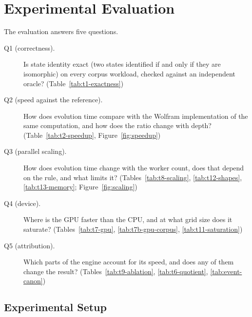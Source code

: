 \section{Experimental Evaluation}
\label{sec:benchmarks}

The evaluation answers five questions.

\begin{description}
\item[Q1 (correctness).] Is state identity exact (two states identified if and only if they are
isomorphic) on every corpus workload, checked against an independent oracle?
(Table~\ref{tab:t1-exactness})
\item[Q2 (speed against the reference).] How does evolution time compare with the Wolfram
implementation of the same computation, and how does the ratio change with depth?
(Table~\ref{tab:t2-speedup}, Figure~\ref{fig:speedup})
\item[Q3 (parallel scaling).] How does evolution time change with the worker count, does that
depend on the rule, and what limits it? (Tables~\ref{tab:t8-scaling}, \ref{tab:t12-shapes},
\ref{tab:t13-memory}; Figure~\ref{fig:scaling})
\item[Q4 (device).] Where is the GPU faster than the CPU, and at what grid size does it saturate?
(Tables~\ref{tab:t7-gpu}, \ref{tab:t7b-gpu-corpus}, \ref{tab:t11-saturation})
\item[Q5 (attribution).] Which parts of the engine account for its speed, and does any of them
change the result? (Tables~\ref{tab:t9-ablation}, \ref{tab:t6-quotient}, \ref{tab:event-canon})
\end{description}

\subsection{Experimental Setup}

